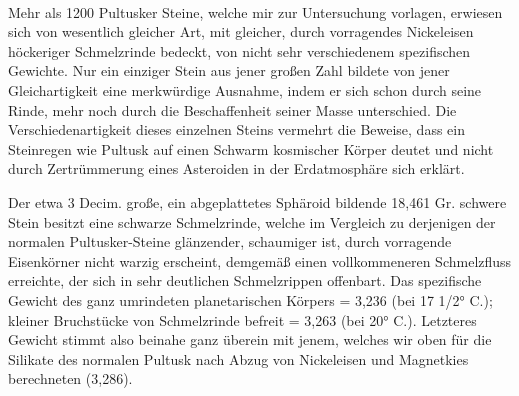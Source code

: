 \documentclass[a4paper, 11pt, oneside, german]{article}
\begin{document}
\paragraph{}
Mehr als 1200 Pultusker Steine, welche mir zur Untersuchung vorlagen, erwiesen sich von wesentlich gleicher Art, mit gleicher, durch vorragendes Nickeleisen höckeriger Schmelzrinde bedeckt, von nicht sehr verschiedenem spezifischen Gewichte. Nur ein einziger Stein aus jener großen Zahl bildete von jener Gleichartigkeit eine merkwürdige Ausnahme, indem er sich schon durch seine Rinde, mehr noch durch die Beschaffenheit seiner Masse unterschied. Die Verschiedenartigkeit dieses einzelnen Steins vermehrt die Beweise, dass ein Steinregen wie Pultusk auf einen Schwarm kosmischer Körper deutet und nicht durch Zertrümmerung eines Asteroiden in der Erdatmosphäre sich erklärt.

Der etwa 3 Decim. große, ein abgeplattetes Sphäroid bildende 18,461 Gr. schwere Stein besitzt eine schwarze Schmelzrinde, welche im Vergleich zu derjenigen der normalen Pultusker-Steine glänzender, schaumiger ist, durch vorragende Eisenkörner nicht warzig erscheint, demgemäß einen vollkommeneren Schmelzfluss erreichte, der sich in sehr deutlichen Schmelzrippen offenbart. Das spezifische Gewicht des ganz umrindeten planetarischen Körpers = 3,236 (bei 17 1/2° C.); kleiner Bruchstücke von Schmelzrinde befreit = 3,263 (bei 20° C.). Letzteres Gewicht stimmt also beinahe ganz überein mit jenem, welches wir oben für die Silikate des normalen Pultusk nach Abzug von Nickeleisen und Magnetkies berechneten (3,286).
\end{document}
